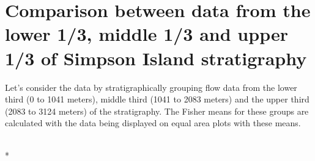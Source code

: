 \documentclass[letterpaper,10pt,english]{/Users/polarwander/Library/Enthought/Canopy_64bit/User/lib/python2.7/site-packages/sphinx/texinputs/sphinxhowto}
\def\smaller{\fontsize{9.5pt}{9.5pt}\selectfont}
\begin{document}
\section{Comparison between data from the lower 1/3, middle 1/3 and upper 1/3 of
Simpson Island stratigraphy}Let's consider the data by stratigraphically grouping flow data from the
lower third (0 to 1041 meters), middle third (1041 to 2083 meters) and
the upper third (2083 to 3124 meters) of the stratigraphy. The Fisher
means for these groups are calculated with the data being displayed on
equal area plots with these means.


    
        \vspace{6pt}
        \makebox[0.1\linewidth]{\smaller\hfill\tt\color{nbframe-in-prompt}In\hspace{4pt}{[}5{]}:\hspace{4pt}}\\*
        \vspace{-2.65\baselineskip}
\end{document}

